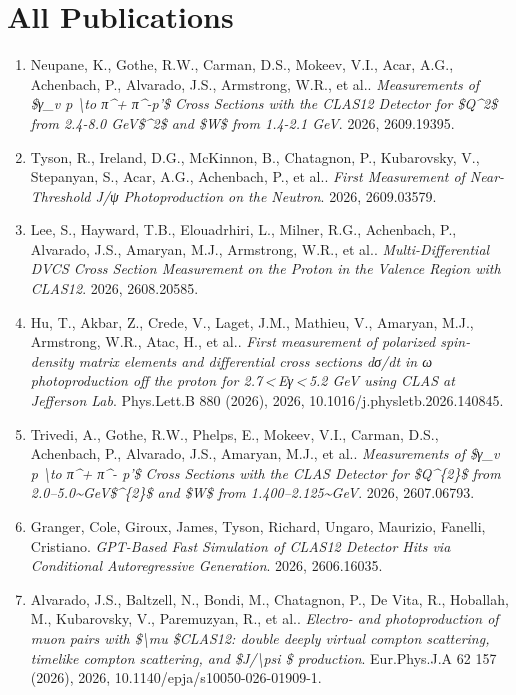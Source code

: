 \section*{All Publications}
\begin{enumerate}
\item Neupane, K., Gothe, R.W., Carman, D.S., Mokeev, V.I., Acar, A.G., Achenbach, P., Alvarado, J.S., Armstrong, W.R., et al.. \textit{Measurements of \$γ\_v p \textbackslash{}to π\textasciicircum{}+ π\textasciicircum{}-p'\$ Cross Sections with the CLAS12 Detector for \$Q\textasciicircum{}2\$ from 2.4-8.0 GeV\$\textasciicircum{}2\$ and \$W\$ from 1.4-2.1 GeV}. 2026, 2609.19395.
\item Tyson, R., Ireland, D.G., McKinnon, B., Chatagnon, P., Kubarovsky, V., Stepanyan, S., Acar, A.G., Achenbach, P., et al.. \textit{First Measurement of Near-Threshold J/ψ Photoproduction on the Neutron}. 2026, 2609.03579.
\item Lee, S., Hayward, T.B., Elouadrhiri, L., Milner, R.G., Achenbach, P., Alvarado, J.S., Amaryan, M.J., Armstrong, W.R., et al.. \textit{Multi-Differential DVCS Cross Section Measurement on the Proton in the Valence Region with CLAS12}. 2026, 2608.20585.
\item Hu, T., Akbar, Z., Crede, V., Laget, J.M., Mathieu, V., Amaryan, M.J., Armstrong, W.R., Atac, H., et al.. \textit{First measurement of polarized spin-density matrix elements and differential cross sections dσ/dt in ω photoproduction off the proton for 2.7 < Eγ < 5.2 GeV using CLAS at Jefferson Lab}. Phys.Lett.B 880 (2026), 2026, 10.1016/j.physletb.2026.140845.
\item Trivedi, A., Gothe, R.W., Phelps, E., Mokeev, V.I., Carman, D.S., Achenbach, P., Alvarado, J.S., Amaryan, M.J., et al.. \textit{Measurements of \$γ\_v p \textbackslash{}to π\textasciicircum{}+ π\textasciicircum{}- p'\$ Cross Sections with the CLAS Detector for \$Q\textasciicircum{}\{2\}\$ from 2.0--5.0\textasciitilde{}GeV\$\textasciicircum{}\{2\}\$ and \$W\$ from 1.400--2.125\textasciitilde{}GeV}. 2026, 2607.06793.
\item Granger, Cole, Giroux, James, Tyson, Richard, Ungaro, Maurizio, Fanelli, Cristiano. \textit{GPT-Based Fast Simulation of CLAS12 Detector Hits via Conditional Autoregressive Generation}. 2026, 2606.16035.
\item Alvarado, J.S., Baltzell, N., Bondi, M., Chatagnon, P., De Vita, R., Hoballah, M., Kubarovsky, V., Paremuzyan, R., et al.. \textit{Electro- and photoproduction of muon pairs with \$\textbackslash{}mu \$CLAS12: double deeply virtual compton scattering, timelike compton scattering, and \$J/\textbackslash{}psi \$ production}. Eur.Phys.J.A 62 157 (2026), 2026, 10.1140/epja/s10050-026-01909-1.

\end{enumerate}
